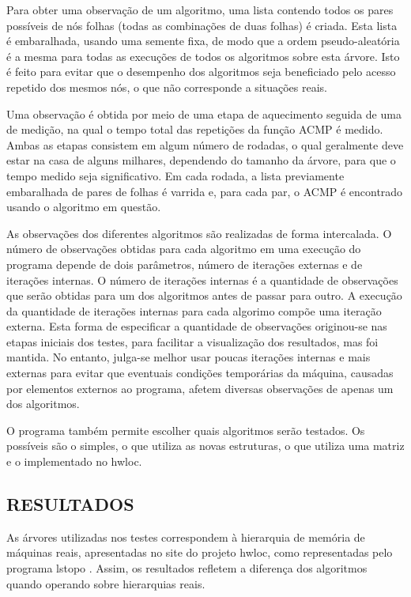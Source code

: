 Para obter uma observação de um algoritmo, uma lista contendo todos os pares possíveis de nós folhas (todas as combinações de duas folhas) é criada.
Esta lista é embaralhada, usando uma semente fixa, de modo que a ordem pseudo-aleatória é a mesma para todas as execuções de todos os algoritmos sobre esta árvore.
Isto é feito para evitar que o desempenho dos algoritmos seja beneficiado pelo acesso repetido dos mesmos nós, o que não corresponde a situações reais.

Uma observação é obtida por meio de uma etapa de aquecimento seguida de uma de medição, na qual o tempo total das repetições da função ACMP é medido.
Ambas as etapas consistem em algum número de rodadas, o qual geralmente deve estar na casa de alguns milhares, dependendo do tamanho da árvore, para que o tempo medido seja significativo.
Em cada rodada, a lista previamente embaralhada de pares de folhas é varrida e, para cada par, o ACMP é encontrado usando o algoritmo em questão.

As observações dos diferentes algoritmos são realizadas de forma intercalada.
O número de observações obtidas para cada algoritmo em uma execução do programa depende de dois parâmetros, número de iterações externas e de iterações internas.
O número de iterações internas é a quantidade de observações que serão obtidas para um dos algoritmos antes de passar para outro.
A execução da quantidade de iterações internas para cada algorimo compõe uma iteração externa.
Esta forma de especificar a quantidade de observações originou-se nas etapas iniciais dos testes, para facilitar a visualização dos resultados, mas foi mantida.
No entanto, julga-se melhor usar poucas iterações internas e mais externas para evitar que eventuais condições temporárias da máquina, causadas por elementos externos ao programa, afetem diversas observações de apenas um dos algoritmos.

O programa também permite escolher quais algoritmos serão testados.
Os possíveis são o simples, o que utiliza as novas estruturas, o que utiliza uma matriz e o implementado no hwloc.



\subsection{RESULTADOS}

As árvores utilizadas nos testes correspondem à hierarquia de memória de máquinas reais, apresentadas no site do projeto hwloc, como representadas pelo programa lstopo \cite{lstopo}.
Assim, os resultados refletem a diferença dos algoritmos quando operando sobre hierarquias reais.

